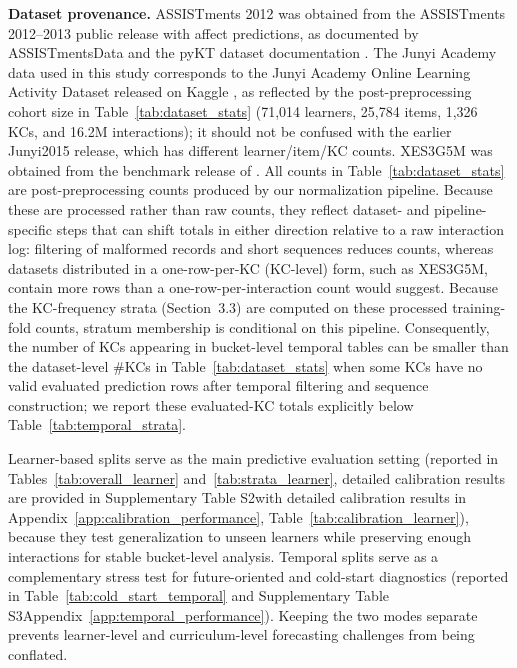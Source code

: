 \textbf{Dataset provenance.} ASSISTments 2012 was obtained from the ASSISTments 2012--2013 public release with affect predictions, as documented by ASSISTmentsData and the pyKT dataset documentation \citep{assistments2012data, liu2022pykt}. The Junyi Academy data used in this study corresponds to the Junyi Academy Online Learning Activity Dataset released on Kaggle \citep{junyi2019kaggle}, as reflected by the post-preprocessing cohort size in Table~\ref{tab:dataset_stats} (71,014 learners, 25,784 items, 1,326 KCs, and 16.2M interactions); it should not be confused with the earlier Junyi2015 release, which has different learner/item/KC counts. XES3G5M was obtained from the benchmark release of \citet{liu2023xes3g5m}. All counts in Table~\ref{tab:dataset_stats} are post-preprocessing counts produced by our normalization pipeline. Because these are processed rather than raw counts, they reflect dataset- and pipeline-specific steps that can shift totals in either direction relative to a raw interaction log: filtering of malformed records and short sequences reduces counts, whereas datasets distributed in a one-row-per-KC (KC-level) form, such as XES3G5M, contain more rows than a one-row-per-interaction count would suggest. Because the KC-frequency strata (Section~3.3) are computed on these processed training-fold counts, stratum membership is conditional on this pipeline. Consequently, the number of KCs appearing in bucket-level temporal tables can be smaller than the dataset-level \#KCs in Table~\ref{tab:dataset_stats} when some KCs have no valid evaluated prediction rows after temporal filtering and sequence construction; we report these evaluated-KC totals explicitly below Table~\ref{tab:temporal_strata}.

Learner-based splits serve as the main predictive evaluation setting (reported in Tables~\ref{tab:overall_learner} and~\ref{tab:strata_learner}, \ifdefined\iscompact detailed calibration results are provided in Supplementary Table S2\else with detailed calibration results in Appendix~\ref{app:calibration_performance}, Table~\ref{tab:calibration_learner}\fi), because they test generalization to unseen learners while preserving enough interactions for stable bucket-level analysis. Temporal splits serve as a complementary stress test for future-oriented and cold-start diagnostics (reported in Table~\ref{tab:cold_start_temporal} and \ifdefined\iscompact Supplementary Table S3\else Appendix~\ref{app:temporal_performance}\fi). Keeping the two modes separate prevents learner-level and curriculum-level forecasting challenges from being conflated.

